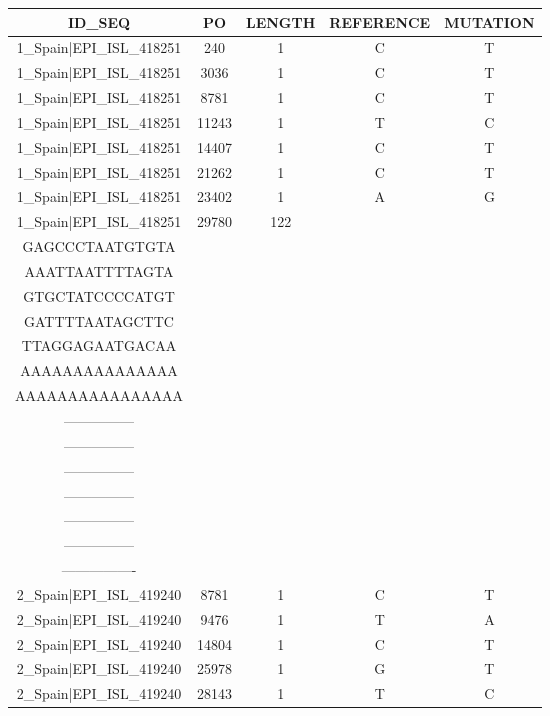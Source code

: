 \documentclass[a4paper,10pt]{article}
\begin{document}
\setlength\LTleft{-1 cm}
\begin{longtable}{@{}ccccc@{}}
\toprule
\textbf{ID\_SEQ} & \textbf{PO} & \textbf{LENGTH} & \textbf{REFERENCE} & \textbf{MUTATION} \\* \midrule
\endfirsthead
%
\cline{1-5}
\endhead
%
1\_Spain|EPI\_ISL\_418251 & 240 & 1 & C & T \\* \midrule
1\_Spain|EPI\_ISL\_418251 & 3036 & 1 & C & T \\* \midrule
1\_Spain|EPI\_ISL\_418251 & 8781 & 1 & C & T \\* \midrule
1\_Spain|EPI\_ISL\_418251 & 11243 & 1 & T & C \\* \midrule
1\_Spain|EPI\_ISL\_418251 & 14407 & 1 & C & T \\* \midrule
1\_Spain|EPI\_ISL\_418251 & 21262 & 1 & C & T \\* \midrule
1\_Spain|EPI\_ISL\_418251 & 23402 & 1 & A & G \\* \midrule
1\_Spain|EPI\_ISL\_418251 & 29780 & 122 & \begin{tabular}[c]{@{}c@{}}AGCTGCCTATATGGAA\\ GAGCCCTAATGTGTA\\ AAATTAATTTTAGTA\\ GTGCTATCCCCATGT\\ GATTTTAATAGCTTC\\ TTAGGAGAATGACAA\\ AAAAAAAAAAAAAAA\\ AAAAAAAAAAAAAAAA\end{tabular} & \begin{tabular}[c]{@{}c@{}}----------------\\ ---------------\\ ---------------\\ ---------------\\ ---------------\\ ---------------\\ ---------------\\ ----------------\end{tabular} \\* \midrule
2\_Spain|EPI\_ISL\_419240 & 8781 & 1 & C & T \\* \midrule
2\_Spain|EPI\_ISL\_419240 & 9476 & 1 & T & A \\* \midrule
2\_Spain|EPI\_ISL\_419240 & 14804 & 1 & C & T \\* \midrule
2\_Spain|EPI\_ISL\_419240 & 25978 & 1 & G & T \\* \midrule
2\_Spain|EPI\_ISL\_419240 & 28143 & 1 & T & C \\* \midrule

\end{longtable}
\end{document}
